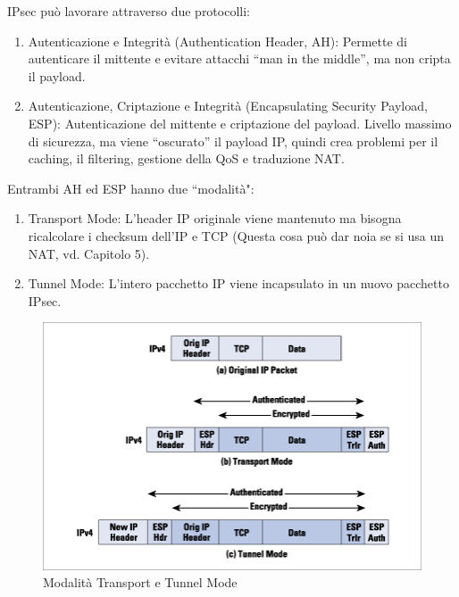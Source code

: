 IPsec può lavorare attraverso due protocolli:
\begin{enumerate}
\item Autenticazione e Integrità (Authentication Header, AH): Permette di autenticare il mittente e evitare attacchi “man in the middle”, ma non cripta il payload.
\item Autenticazione, Criptazione e Integrità (Encapsulating Security Payload, ESP): Autenticazione del mittente e criptazione del payload. Livello massimo di
sicurezza, ma viene “oscurato” il payload IP, quindi crea problemi per il caching, il filtering, gestione della QoS e traduzione NAT.
\end{enumerate}

Entrambi AH ed ESP hanno due \textquotedblleft modalità":
\begin{enumerate}
\item Transport Mode: L'header IP originale viene mantenuto ma bisogna ricalcolare i checksum dell'IP e TCP (Questa cosa può dar noia se si usa un NAT, vd. Capitolo 5). 
\item Tunnel Mode: L’intero pacchetto IP viene incapsulato in un nuovo pacchetto IPsec.
\end{enumerate}
\begin{figure}[htbp]
	\centering
	\includegraphics[scale = 0.7]{images/TransferTunnelMode}
	\caption{Modalità Transport e Tunnel Mode}
	\label{img:transporttunnel}
\end{figure}